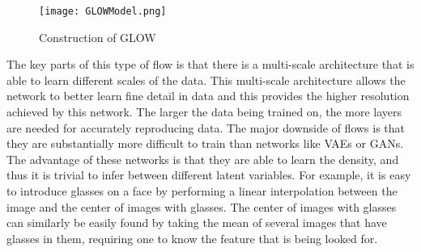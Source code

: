\begin{figure}[ht]
\centering
\texttt{[image: GLOWModel.png]}
\caption{Construction of GLOW}
\label{fig:glow}
\end{figure}

The key parts of this type of flow is that there is a multi-scale architecture
that is able to learn different scales of the data. This multi-scale
architecture allows the network to better learn fine detail in data and this
provides the higher resolution achieved by this network. The larger the data
being trained on, the more layers are needed for accurately reproducing data.
The major downside of flows is that they are substantially more difficult to
train than networks like VAEs or GANs. The advantage of these networks is that
they are able to learn the density, and thus it is trivial to infer between
different latent variables. For example, it is easy to introduce glasses on a
face by performing a linear interpolation between the image and the center of
images with glasses. The center of images with glasses can similarly be easily
found by taking the mean of several images that have glasses in them, requiring
one to know the feature that is being looked for.
